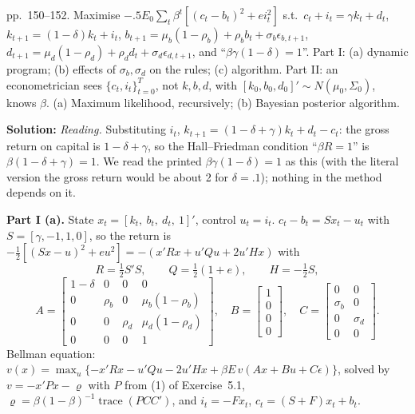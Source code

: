 \documentclass[12pt, letterpaper]{article}
\newcommand{\tr}{\operatorname{trace}}
\begin{document}
\begin{tcolorbox}[oddbox,title={Exercise 5.9 \quad A permanent-income planner and its likelihood}]
\begin{tcolorbox}[questionbox]
pp.~150--152. Maximise $-.5E_0\sum_t\beta^t[(c_t-b_t)^2+ei_t^2]$ s.t.\ $c_t+i_t=\gamma k_t+d_t$,
$k_{t+1}=(1-\delta)k_t+i_t$, $b_{t+1}=\mu_b(1-\rho_b)+\rho_bb_t+\sigma_b\epsilon_{b,t+1}$,
$d_{t+1}=\mu_d(1-\rho_d)+\rho_dd_t+\sigma_d\epsilon_{d,t+1}$, and ``$\beta\gamma(1-\delta)=1$''.
Part I: (a) dynamic program; (b) effects of $\sigma_b,\sigma_d$ on the rules; (c) algorithm.
Part II: an econometrician sees $\{c_t,i_t\}_{t=0}^T$, not $k,b,d$, with
$[k_0,b_0,d_0]'\sim N(\mu_0,\Sigma_0)$, knows $\beta$. (a) Maximum likelihood, recursively;
(b) Bayesian posterior algorithm.
\end{tcolorbox}

\textbf{Solution:} \emph{Reading.} Substituting $i_t$, $k_{t+1}=(1-\delta+\gamma)k_t+d_t-c_t$: the
gross return on capital is $1-\delta+\gamma$, so the Hall--Friedman condition ``$\beta R=1$'' is
$\beta(1-\delta+\gamma)=1$. We read the printed $\beta\gamma(1-\delta)=1$ as this (with the literal
version the gross return would be about 2 for $\delta=.1$); nothing in the method depends on it.

\textbf{Part I (a).} State $x_t=[k_t,\ b_t,\ d_t,\ 1]'$, control $u_t=i_t$. $c_t-b_t=Sx_t-u_t$ with
$S=[\gamma,-1,1,0]$, so the return is $-\tfrac12[(Sx-u)^2+eu^2]=-(x'Rx+u'Qu+2u'Hx)$ with
\[
R=\tfrac12S'S,\qquad Q=\tfrac12(1+e),\qquad H=-\tfrac12S,
\]
\[
A=\begin{bmatrix}1-\delta&0&0&0\\0&\rho_b&0&\mu_b(1-\rho_b)\\0&0&\rho_d&\mu_d(1-\rho_d)\\0&0&0&1\end{bmatrix},\quad
B=\begin{bmatrix}1\\0\\0\\0\end{bmatrix},\quad
C=\begin{bmatrix}0&0\\\sigma_b&0\\0&\sigma_d\\0&0\end{bmatrix}.
\]
Bellman equation:
$v(x)=\max_u\{-x'Rx-u'Qu-2u'Hx+\beta E\,v(Ax+Bu+C\epsilon)\}$, solved by $v=-x'Px-\varrho$ with $P$ from
(1) of Exercise~5.1, $\varrho=\beta(1-\beta)^{-1}\tr(PCC')$, and $i_t=-Fx_t$,
$c_t=(S+F)x_t+b_t$.


\end{tcolorbox}
\end{document}
